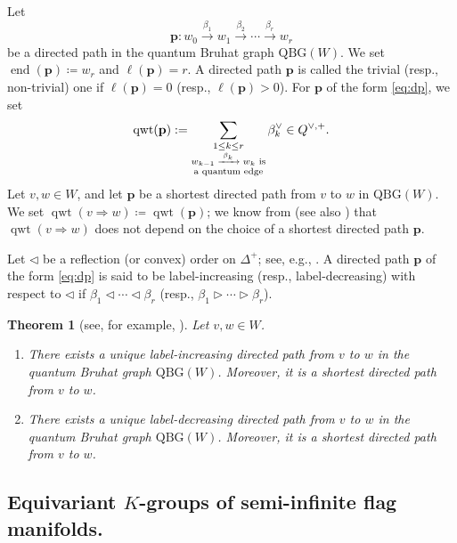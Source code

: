 \documentclass[11pt,a4paper,reqno,dvipdfmx]{amsart}
\numberwithin{equation}{section}
\newcommand{\bp}{\mathbf{p}}
\DeclareMathOperator{\qwt}{qwt}
\DeclareMathOperator{\ed}{end}
\newcommand{\QBG}{\mathrm{QBG}}
\newcommand{\edge}[1]{ \xrightarrow{\hspace{2pt}#1\hspace{2pt}} }
\theoremstyle{plain}
\newtheorem{thm}[lem]{Theorem}
\theoremstyle{definition}
\theoremstyle{remark}
\newenvironment{enu}{%
 \begin{enumerate}%
 \renewcommand{\labelenumi}{\rm (\theenumi)}%
}{\end{enumerate}}
\begin{document}
Let 
%
\begin{equation} \label{eq:dp}
\bp: w_{0} \edge{\beta_{1}} w_{1} \edge{\beta_{2}} \cdots \edge{\beta_{r}} w_{r}
\end{equation}
%
be a directed path in the quantum Bruhat graph $\QBG(W)$. 
We set $\ed(\bp)\coloneqq  w_{r}$ and $\ell(\bp)=r$. 
A directed path $\bp$ is called the trivial (resp., non-trivial) one 
if $\ell(\bp)=0$ (resp., $\ell(\bp) > 0$). 
For $\bp$ of the form \eqref{eq:dp}, we set
%
\begin{equation} \label{eq:def-qwt}
\qwt(\bp) := \sum_{ \begin{subarray}{c} 1 \le k \le r \\ 
\text{$w_{k-1} \edge{\beta_k} w_{k}$ is} \\
\text{a quantum edge} \end{subarray} } \beta_{k}^{\vee} \in Q^{\vee,+}. 
\end{equation}
%
Let $v,w \in W$, and let $\bp$ be a shortest directed path from $v$ to $w$ in $\QBG(W)$. 
We set $\qwt(v \Rightarrow w)\coloneqq  \qwt(\bp)$; 
we know from \cite[Lemma~1]{Pos} (see also \cite[Proposition~8.1]{LNSSS1}) that 
$\qwt(v \Rightarrow w)$ does not depend on the choice of a shortest directed path $\bp$. 

Let $\lhd$ be a reflection (or convex) order on $\Delta^{+}$; 
see, e.g., \cite[\S 2.2]{KoNS}.
A directed path $\bp$ of the form \eqref{eq:dp} is said to be label-increasing 
(resp., label-decreasing) with respect to $\lhd$ 
if $\beta_{1} \lhd \cdots \lhd \beta_{r}$ (resp., $\beta_{1} \rhd \cdots \rhd \beta_{r}$). 
%
%
\begin{thm}[{see, for example, \cite[Theorem~7.4]{LNSSS1}}] \label{thm:label}
Let $v,w \in W$.
%
\begin{enu}
\item There exists a unique label-increasing directed path from $v$ to $w$ 
in the quantum Bruhat graph $\QBG(W)$. Moreover, it is a shortest directed path 
from $v$ to $w$. 

\item There exists a unique label-decreasing directed path from $v$ to $w$ 
in the quantum Bruhat graph $\QBG(W)$. Moreover, it is a shortest directed path 
from $v$ to $w$. 
\end{enu}
%
\end{thm}

%
\subsection{Equivariant $K$-groups of semi-infinite flag manifolds.}
\label{subsec:equivgroup}
\end{document}
